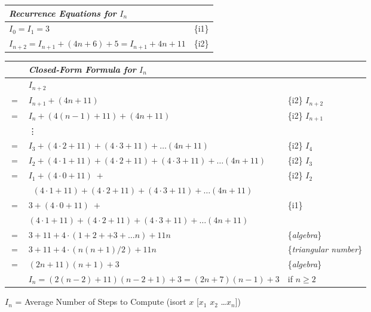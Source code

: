 \begin{figure}
\begin{center}
\begin{spacing}{0.9}
\begin{tabular}{ll}
\emph{Recurrence Equations for} $I_n$ &\\
\hline
$I_0 = I_1 = 3$                                      & \{i1\} \\
$I_{n+2} = I_{n+1} + (4n+6) + 5 = I_{n+1} + 4n + 11$ & \{i2\} \\
\end{tabular}
\end{spacing}
\vspace{2mm}
\begin{spacing}{0.9}
\addtolength{\tabcolsep}{-3pt}
\begin{tabular}{rll}
    & \emph{Closed-Form Formula for} $I_n$ & \\
\hline
    & $I_{n+2}$ & \\
$=$ & $I_{n+1} + (4n+11)$ & \{i2\} $I_{n+2}$\\
$=$ & $I_{n} + (4(n-1)+11) + (4n+11)$ & \{i2\} $I_{n+1}$ \\
    & \vdots & \\
$=$ & $I_{3} + (4\cdot 2 + 11) + (4\cdot 3 + 11) + \dots (4n+11)$                   & \{i2\} $I_{4}$ \\
$=$ & $I_{2} + (4\cdot 1 + 11) + (4\cdot 2 + 11) + (4\cdot 3 + 11) + \dots (4n+11)$ & \{i2\} $I_{3}$ \\
$=$ & $I_{1} + (4\cdot 0 + 11)$~$+$                                                 & \{i2\} $I_{2}$ \\
    & \phantom{$I_{2} + $} ~$(4\cdot 1 + 11) + (4\cdot 2 + 11) + (4\cdot 3 + 11) + \dots (4n+11)$ & \\
$=$ & $3 + (4\cdot 0 + 11)$~$+$                                                     & \{i1\}\\
    & \phantom{$I_{2} + $} $(4\cdot 1 + 11) + (4\cdot 2 + 11) + (4\cdot 3 + 11) + \dots (4n+11)$ & \\
$=$ & $3 + 11 + 4\cdot(1 + 2 + + 3 + \dots n) + 11n$                                & \{\emph{algebra}\} \\
$=$ & $3 + 11 + 4\cdot(n(n+1)/2) + 11n$                                             & \{\emph{triangular number}\} \\
$=$ & $(2n+11)(n+1) + 3$                                                            & \{\emph{algebra}\} \vspace{2mm}\\
    & $I_n = (2(n-2)+11)(n-2+1) + 3 = (2n+7)(n-1)+3$                                & if $n\geq 2$\\
\end{tabular}\addtolength{\tabcolsep}{3pt}
\end{spacing}
\end{center}
\caption{$I_n$ = Average Number of Steps to Compute \textsf{(isort $x$ [$x_1$ $x_2$ \dots $x_{n}$])}}
\label{fig:isort-steps}
\end{figure}

